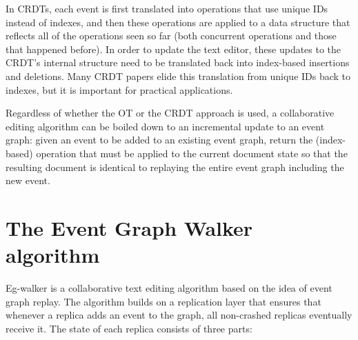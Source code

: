 \documentclass[sigplan,10pt]{acmart}
\newcommand{\algname}{Eg-walker\xspace}
\begin{document}
In CRDTs, each event is first translated into operations that use unique IDs instead of indexes, and then these operations are applied to a data structure that reflects all of the operations seen so far (both concurrent operations and those that happened before).
In order to update the text editor, these updates to the CRDT's internal structure need to be translated back into index-based insertions and deletions.
Many CRDT papers elide this translation from unique IDs back to indexes, but it is important for practical applications. %



Regardless of whether the OT or the CRDT approach is used, a collaborative editing algorithm can be boiled down to an incremental update to an event graph: given an event to be added to an existing event graph, return the (index-based) operation that must be applied to the current document state so that the resulting document is identical to replaying the entire event graph including the new event.


\section{The Event Graph Walker algorithm}\label{algorithm}

\algname is a collaborative text editing algorithm based on the idea of event graph replay.
The algorithm builds on a replication layer that ensures that whenever a replica adds an event to the graph, all non-crashed replicas eventually receive it.
The state of each replica consists of three parts:
\end{document}
